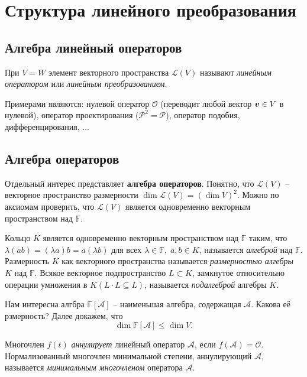 \section{Структура линейного преобразования}

\subsection{Алгебра линейный операторов}
При $V = W$ элемент векторного пространства $\mathcal L (V)$ называют \textit{линейным оператором} или \textit{линейным преобразованием}. 

Примерами являются: нулевой оператор $\mathcal O$ (переводит любой вектор $\mbox{\boldmath $v$} \in V$  в нулевой), оператор проектирования ($\mathcal P^2 = \mathcal P$), оператор подобия, дифференцирования, ...


\subsection{Алгебра операторов}


Отдельный интерес представляет \textbf{алгебра операторов}. Понятно, что $\mathcal L (V)$ -- векторное пространство размерности $\dim \mathcal L (V) = \left(\dim V\right)^2$. Можно по аксиомам проверить, что $\mathcal L (V)$ является одновременно  векторным пространством над $\mathbb{F}$.

\begin{to_def} 
    Кольцо $K$ является одновременно векторным пространством над $\mathbb{F}$ таким, что $\lambda(ab) = (\lambda a) b = a (\lambda b)$ для всех $\lambda \in \mathbb{F}, \; a,b \in K $, называется \textit{алгеброй} над $\mathbb{F}$. Размерность $K  $ как векторного пространства называется \textit{размерностью алгебры} $K $ над $\mathbb{F} $. Всякое векторное подпространство $L \subset K $, замкнутое относительно операции умножения в $K (L \cdot L \subseteq L)$, называется \textit{подалгеброй} алгебры $K $.
\end{to_def}

Нам интересна алгбра $\mathbb{F}[\mathcal A] $ -- наименьшая алгебра, содержащая $\mathcal A $. Какова её рзмерность? Далее докажем, что 
$$
    \dim \mathbb{F}[\mathcal A] \leq \dim V.
$$

\begin{to_def} 
    Многочлен $f(t)$ \textit{аннулирует} линейный оператор $\mathcal A$, если $f(\mathcal A) = \mathcal O $. Нормализованный многочлен минимальной степени, аннулирующий $\mathcal A $, называется \textit{минимальным многочленом} оператора $\mathcal A $. 
\end{to_def}


